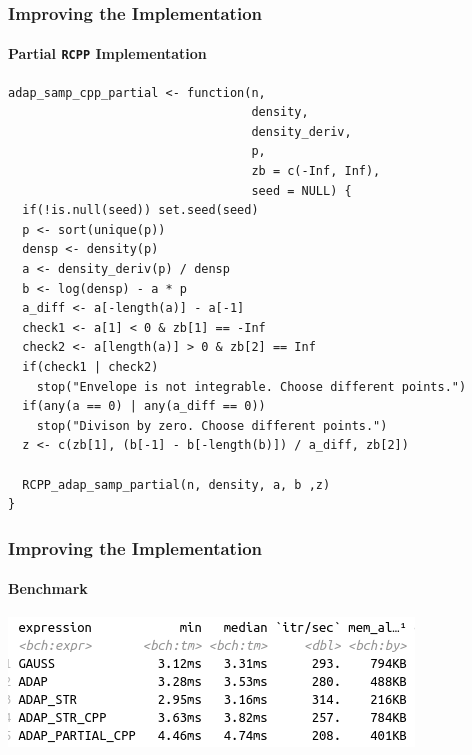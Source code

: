 \documentclass[aspectratio=169]{beamer}
\begin{document}
\begin{frame}[fragile]
  \frametitle{Improving the Implementation}
  \framesubtitle{Partial \texttt{RCPP} Implementation}
\begin{verbatim}
adap_samp_cpp_partial <- function(n, 
                                  density, 
                                  density_deriv, 
                                  p, 
                                  zb = c(-Inf, Inf),
                                  seed = NULL) {
  if(!is.null(seed)) set.seed(seed)
  p <- sort(unique(p))
  densp <- density(p)
  a <- density_deriv(p) / densp
  b <- log(densp) - a * p
  a_diff <- a[-length(a)] - a[-1]
  check1 <- a[1] < 0 & zb[1] == -Inf
  check2 <- a[length(a)] > 0 & zb[2] == Inf
  if(check1 | check2)
    stop("Envelope is not integrable. Choose different points.")
  if(any(a == 0) | any(a_diff == 0))
    stop("Divison by zero. Choose different points.")
  z <- c(zb[1], (b[-1] - b[-length(b)]) / a_diff, zb[2])
  
  RCPP_adap_samp_partial(n, density, a, b ,z)
}
\end{verbatim}
\end{frame}
\begin{frame}
  \frametitle{Improving the Implementation}
  \framesubtitle{Benchmark}
  \centering
  \includegraphics[scale = 0.6]{figure/RCPP_FULL.png}
\end{frame}
\end{document}
